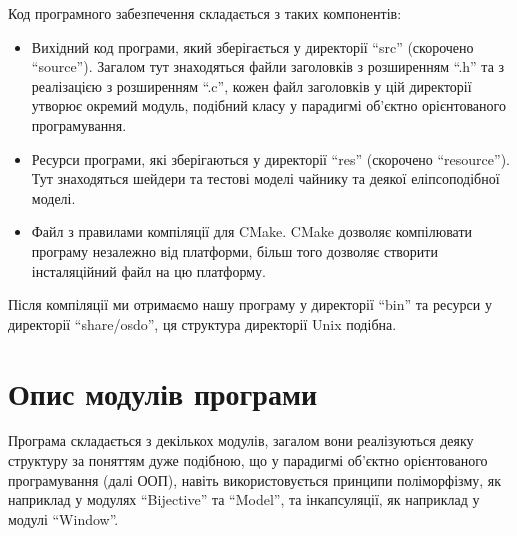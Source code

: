 \documentclass[14pt,a4paper]{extarticle}
\theoremstyle{definition}
\renewcommand{\[}{\begin{singlespace}\begin{equation*}}
\renewcommand{\]}{\end{equation*}\end{singlespace}}
\begin{document}
Код програмного забезпечення складається з таких компонентів:
\begin{itemize}
\item Вихідний код програми, який зберігається у директорії ``src'' (скорочено ``source''). Загалом тут знаходяться файли заголовків з розширенням ``.h'' та з реалізацією з розширенням ``.c'', кожен файл заголовків у цій директорії утворює окремий модуль, подібний класу у парадигмі об'єктно орієнтованого програмування.
\item Ресурси програми, які зберігаються у директорії ``res'' (скорочено ``resource''). Тут знаходяться шейдери та тестові моделі чайнику та деякої еліпсоподібної моделі.
\item Файл з правилами компіляції для CMake. CMake дозволяє компілювати програму незалежно від платформи, більш того дозволяє створити інсталяційний файл на цю платформу.
\end{itemize}

Після компіляції ми отримаємо нашу програму у директорії ``bin'' та ресурси у директорії ``share/osdo'', ця структура директорії Unix подібна.

\section{Опис модулів програми}

Програма складається з декількох модулів, загалом вони реалізуються деяку структуру за поняттям дуже подібною, що у парадигмі об'єктно орієнтованого програмування (далі ООП), навіть використовується принципи поліморфізму, як наприклад у модулях ``Bijective'' та ``Model'', та інкапсуляції, як наприклад у модулі ``Window''.
\end{document}
